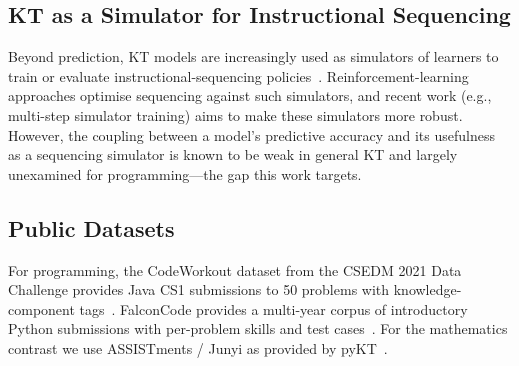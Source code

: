 \subsection{KT as a Simulator for Instructional Sequencing}
Beyond prediction, KT models are increasingly used as simulators of
learners to train or evaluate instructional-sequencing
policies~\cite{piech2015dkt}. Reinforcement-learning approaches optimise
sequencing against such simulators, and recent work (e.g., multi-step
simulator training) aims to make these simulators more robust. However,
the coupling between a model's predictive accuracy and its usefulness as
a sequencing simulator is known to be weak in general KT and largely
unexamined for programming---the gap this work targets.

\subsection{Public Datasets}
For programming, the CodeWorkout dataset from the CSEDM 2021 Data
Challenge provides Java CS1 submissions to 50 problems with
knowledge-component tags~\cite{csedm2021}. FalconCode provides a
multi-year corpus of introductory Python submissions with per-problem
skills and test cases~\cite{falconcode2023}. For the mathematics
contrast we use ASSISTments / Junyi as provided by
pyKT~\cite{liu2022pykt}.
